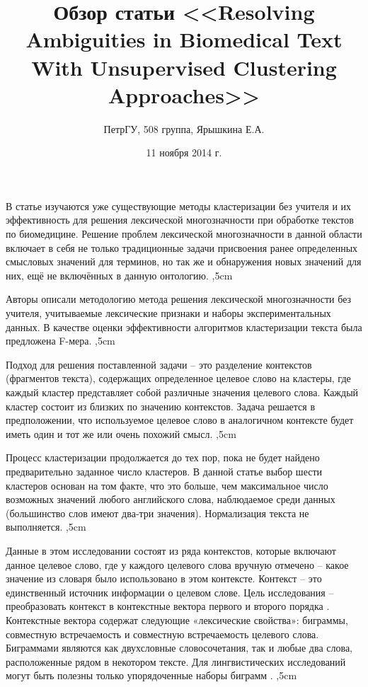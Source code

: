 \documentclass[12pt]{article}
\title{Обзор статьи  <<Resolving Ambiguities in Biomedical Text With Unsupervised Clustering Approaches>>}
\author{ПетрГУ, 508 группа, Ярышкина Е.А.}
\date{11 ноября 2014 г.}
\begin{document}
 
\maketitle

В статье \cite{Savova} изучаются уже существующие методы кластеризации без учителя и их эффективность для решения лексической многозначности при обработке текстов по биомедицине. Решение проблем лексической многозначности в данной области включает в себя не только традиционные задачи присвоения ранее определенных смысловых значений для терминов, но так же и обнаружения новых значений для них, ещё не включённых в данную онтологию.
,5cm

Авторы описали методологию метода решения лексической многозначности без учителя, учитываемые лексические признаки и наборы экспериментальных данных. В качестве оценки эффективности алгоритмов кластеризации текста была предложена F-мера. 
,5cm

Подход для решения поставленной задачи -- это разделение контекстов (фрагментов текста), содержащих определенное целевое слово на кластеры, где каждый кластер представляет собой различные значения целевого слова. Каждый кластер состоит из близких по значению контекстов. Задача решается в предположении, что используемое целевое слово в аналогичном контексте будет иметь один и тот же или очень похожий смысл. 
,5cm

Процесс кластеризации продолжается до тех пор, пока не будет найдено предварительно заданное число кластеров. В данной статье выбор шести кластеров основан на том факте, что это больше, чем максимальное число возможных значений любого английского слова, наблюдаемое среди данных (большинство слов имеют два-три значения). Нормализация текста не выполняется.
,5cm

Данные в этом исследовании состоят из ряда контекстов, которые включают данное целевое слово, где у каждого целевого слова вручную отмечено -- какое значение из словаря было использовано в этом контексте. Контекст -- это единственный источник информации о целевом слове. Цель исследования -- преобразовать контекст в контекстные вектора первого и второго порядка \cite{epr:website}. Контекстные вектора содержат следующие «лексические свойства»: биграммы, совместную встречаемость и совместную встречаемость целевого слова. Биграммами являются как двухсловные словосочетания, так и любые два слова, расположенные рядом в некотором тексте. Для лингвистических исследований могут быть полезны только упорядоченные наборы биграмм \cite{Averin}. 
,5cm
\end{document}
